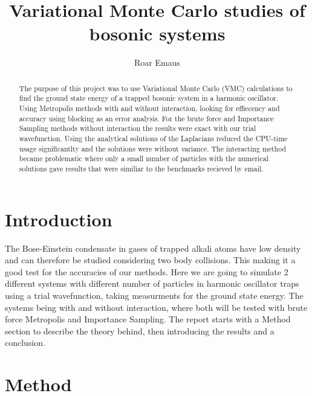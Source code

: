 \documentclass[12pt]{article}
\title{Variational Monte Carlo studies of bosonic systems}
\author{Roar Emaus}
\begin{document}
\maketitle
  \begin{abstract}
    The purpose of this project was to use Variational Monte Carlo (VMC) calculations
    to find the ground state energy of a trapped bosonic system in a harmonic oscillator.
    Using Metropolis methods with and without interaction, looking for effiecency and 
    accuracy using blocking as an error analysis.
    For the brute force and Importance Sampling methods without interaction the results
    were exact with our trial wavefunction. Using the analytical solutions of the
    Laplacians reduced the CPU-time usage significantlty and the solutions were without
    variance. 
    The interacting method became problematic where only a small number of particles
    with the numerical solutions gave results that were similiar to the benchmarks
    recieved by email.
  \end{abstract}
  \newpage
  \tableofcontents
  \newpage
  \section{Introduction}
  The Bose-Einstein condensate in gases of trapped alkali atoms have low density
  and can therefore be studied considering two body collisions. This making it
  a good test for the accuracies of our methods.
  Here we are going to simulate 2 different systems with different number of particles
  in harmonic oscillator traps using a trial wavefunction\cite{BEcond}, 
  taking measurments for the ground state energy. The systems being with and without
  interaction, where both will be tested with brute force Metropolis and Importance
  Sampling. The report starts with a Method section to describe the theory behind, then
  introducing the results and a conclusion.

  \section{Method}
\end{document}
